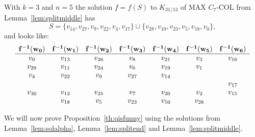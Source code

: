 \documentclass[11pt,a4paper]{article}
\begin{document}
\begin{exmp}
With $k=3$ and $n=5$ the solution $f= f(S)$ to $K_{31/13}$ of {\sc MAX $C_7$-COL} from Lemma~\ref{lem:splitmiddle} has
\[
S = \{v_{14}, v_{27}, v_{9}, v_{22}, v_{4}, v_{17}\} \cup \{v_{28}, v_{10}, v_{23}, v_{5}, v_{18}, v_{0}\},
\]
and looks like:
\[
\begin{array}{c c c c c c c}
{\bf f^{-1}(w_0)} & {\bf f^{-1}(w_1)} & {\bf f^{-1}(w_2)} & {\bf f^{-1}(w_3)} & {\bf f^{-1}(w_4)} & {\bf f^{-1}(w_5)} & {\bf f^{-1}(w_6)} \\ \hline
v_0 & v_{13} & v_{26} & v_8 & v_{21} & v_3 & v_{16} \\
v_{29} & v_{11} & v_{24} & v_6 & v_{19} & v_1 &  \\
v_4 & v_{22} & v_{9} & v_{27} & v_{14} & & \\
& & & & & & v_{17} \\
v_{30} & v_{12} & v_{25} & v_{7} & v_{20} & v_2 & v_{15}  \\
& v_{18} & v_5 & v_{23} & v_{10} & v_{28} &
\end{array}
\]
\end{exmp}







\noindent
We will now prove Proposition~\ref{th:qisfunny} using the solutions from
Lemma~\ref{lem:solalpha}, Lemma~\ref{lem:splitend} and Lemma~\ref{lem:splitmiddle}.
\end{document}
